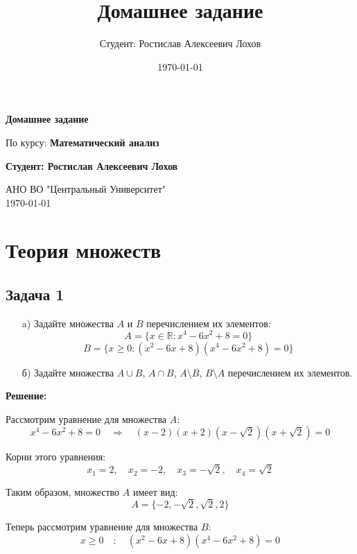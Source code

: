 \documentclass[a4paper,12pt]{article}
\title{Домашнее задание}
\author{Студент: Ростислав Алексеевич Лохов}
\date{\today}
\begin{document}
\begin{titlepage}
    \centering
    \vspace*{1cm}

    \Huge
    \textbf{Домашнее задание}

    \vspace{0.5cm}
    \LARGE
    По курсу: \textbf{Математический анализ}

    \vspace{1.5cm}

    \textbf{Студент: Ростислав Алексеевич Лохов}

    \vfill

    \Large
    АНО ВО "Центральный Университет"\\
    \vspace{0.3cm}
    \today

\end{titlepage}

\tableofcontents
\newpage

\section{Теория множеств}

\subsection{Задача 1}
\begin{itemize}
    \item[a)] Задайте множества \(A\) и \(B\) перечислением их элементов:
    \[
    A = \{x \in \mathbb{R} : x^4 - 6x^2 + 8 = 0\}
    \]
    \[
    B = \{x \geq 0 : (x^2 - 6x + 8)(x^4 - 6x^2 + 8) = 0\}
    \]
    \item[б)] Задайте множества \(A \cup B\), \(A \cap B\), \(A \setminus B\), \(B \setminus A\) перечислением их элементов.
\end{itemize}

\textbf{Решение:}

Рассмотрим уравнение для множества \(A\):
\[
x^4 - 6x^2 + 8 = 0 \quad \Rightarrow \quad (x-2)(x+2)(x-\sqrt{2})(x+\sqrt{2}) = 0
\]

Корни этого уравнения:
\[
x_1 = 2, \quad x_2 = -2, \quad x_3 = -\sqrt{2}, \quad x_4 = \sqrt{2}
\]

Таким образом, множество \(A\) имеет вид:
\[
A = \{-2, -\sqrt{2}, \sqrt{2}, 2\}
\]

Теперь рассмотрим уравнение для множества \(B\):
\[
x \geq 0 \quad : \quad (x^2 - 6x + 8)(x^4 - 6x^2 + 8) = 0
\]
\end{document}
